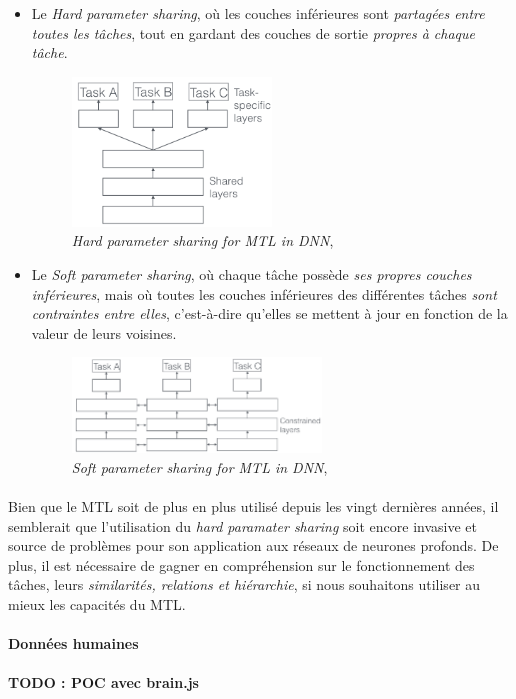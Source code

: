 \begin{itemize}
    \item Le \emph{Hard parameter sharing}, où les couches inférieures sont \emph{partagées entre toutes les tâches}, tout en gardant
    des couches de sortie \emph{propres à chaque tâche}.
    \begin{figure}[h]
        \centering
        \includegraphics[width=200px]{chapters/03/images/hard-param-sharing.png}
        \caption{\label{hard-param-sharing}\emph{Hard parameter sharing for MTL in DNN}, \cite{NeuralNets0}}
    \end{figure}

    \item Le \emph{Soft parameter sharing}, où chaque tâche possède \emph{ses propres couches inférieures}, mais où toutes les couches
    inférieures des différentes tâches \emph{sont contraintes entre elles}, c'est-à-dire qu'elles se mettent à jour en fonction de la valeur
    de leurs voisines.
    \begin{figure}[h]
        \centering
        \includegraphics[width=250px]{chapters/03/images/soft-param-sharing.png}
        \caption{\label{soft-param-sharing}\emph{Soft parameter sharing for MTL in DNN}, \cite{NeuralNets0}}
    \end{figure}
\end{itemize}

\paragraph{} Bien que le MTL soit de plus en plus utilisé depuis les vingt dernières années, il semblerait que l'utilisation 
du \emph{hard paramater sharing} soit encore invasive et source de problèmes pour son application aux réseaux de neurones profonds.
\cite{NeuralNets0} De plus, il est nécessaire de gagner en compréhension sur le fonctionnement des tâches, leurs \emph{similarités,
relations et hiérarchie}, si nous souhaitons utiliser au mieux les capacités du MTL.

\paragraph{Données humaines}

\paragraph{TODO : POC avec brain.js}
